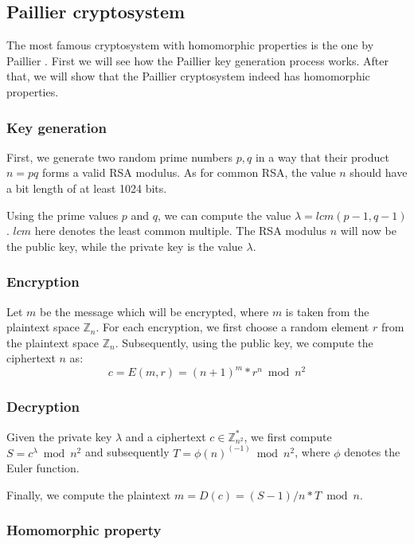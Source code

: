 \subsection{Paillier cryptosystem}

The most famous cryptosystem with homomorphic properties is the one by Paillier \cite{hc:Paillier}. First we will see how the Paillier key generation process works. After that, we will show that the Paillier cryptosystem indeed has homomorphic properties.

\subsubsection{Key generation}

First, we generate two random prime numbers $p,q$ in a way that their product $n=pq$ forms  a valid RSA modulus. As for common RSA, the value $n$ should have a bit length of at least 1024 bits.

Using the prime values $p$ and $q$, we can compute the value $\lambda = \textit{lcm}(p-1,q-1)$. $\textit{lcm}$ here denotes the least common multiple. The RSA modulus $n$ will now be the public key, while the private key is the value $\lambda$.

\subsubsection{Encryption}

Let $m$ be the message which will be encrypted, where $m$ is taken from the plaintext space $\mathbb{Z}_n$. For each encryption, we first choose a random element $r$ from the plaintext space $\mathbb{Z}_n$. Subsequently, using the public key, we compute the ciphertext $n$ as:
%
$$c = E(m,r) = (n+1)^m  * r^n  \bmod n^2$$
%
\subsubsection{Decryption}

Given the private key $\lambda$ and a ciphertext $c \in \mathbb{Z}_{n^2}^*$, we first compute $S = c^\lambda \bmod n^2$ and subsequently $T = \phi(n)^{(-1)} \bmod n^2$, where $\phi$ denotes the Euler function.

Finally, we compute the plaintext $m = D(c) = (S-1)/n * T \bmod n$.

\subsubsection{Homomorphic property}

